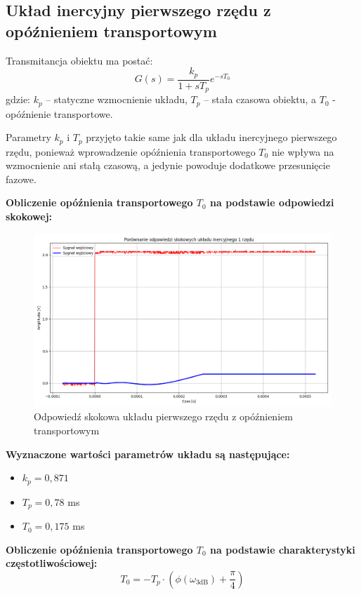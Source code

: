 \documentclass[12pt,a4paper]{article}
\begin{document}
	\subsection{Układ inercyjny pierwszego rzędu z opóźnieniem transportowym}
	Transmitancja obiektu ma postać:
	\begin{equation}
		G(s) = \frac{k_p}{1 + sT_p} e^{-sT_0}
	\end{equation}
	gdzie: \(k_p\) – statyczne wzmocnienie układu, \(T_p\) – stała czasowa obiektu, a \(T_0\) - opóźnienie transportowe.
	
	Parametry $k_p$ i $T_p$ przyjęto takie same jak dla układu inercyjnego pierwszego rzędu, ponieważ wprowadzenie opóźnienia transportowego $T_0$ nie wpływa na wzmocnienie ani stałą czasową, a jedynie powoduje dodatkowe przesunięcie fazowe.
	
	\textbf{Obliczenie opóźnienia transportowego $T_0$ na podstawie odpowiedzi skokowej:}
	\begin{figure}[H]
		\centering
		\includegraphics[width=1\linewidth]{zdjecia/odp_skok_z_opz.png}
		\caption{Odpowiedź skokowa układu pierwszego rzędu z opóźnieniem transportowym}
		\label{fig:odp_skok_z_opz}
	\end{figure}
	
	\textbf{Wyznaczone wartości parametrów układu są następujące:}
	\begin{itemize}
		\item $k_p = 0{,}871$
		\item $T_p = 0{,}78$ ms
		\item $T_0 = 0{,}175$ ms
	\end{itemize}
	
	\textbf{Obliczenie opóźnienia transportowego $T_0$ na podstawie charakterystyki częstotliwościowej:}
	\begin{equation}
		T_0 = -T_p \cdot \left( \phi(\omega_{3\text{dB}}) + \frac{\pi}{4} \right)
	\end{equation}
	
\end{document}
